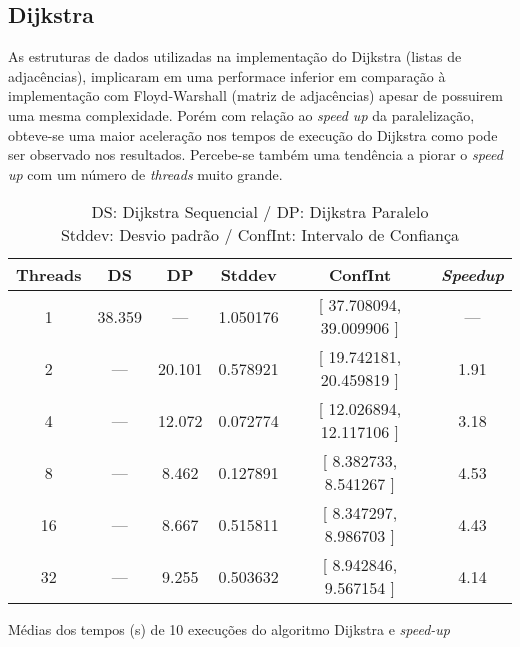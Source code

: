 \newpage
\subsection{Dijkstra}

As estruturas de dados utilizadas na implementação do Dijkstra (listas de adjacências), implicaram em uma performace inferior em comparação à implementação com Floyd-Warshall (matriz de adjacências) apesar de possuirem uma mesma complexidade. Porém com relação ao \textit{speed up} da paralelização, obteve-se uma maior aceleração nos tempos de execução do Dijkstra como pode ser observado nos resultados. Percebe-se também uma tendência a piorar o \textit{speed up} com um número de \textit{threads} muito grande.

\begin{table}[h]
\begin{center}
	\begin{tabular}{|c||c|c|c|c|c|} 
		\hline
		Threads & DS & DP & Stddev & ConfInt &\textit{Speedup} \\
		\hline

		1  & 38.359 & ---    & 1.050176 & [ 37.708094, 39.009906 ] & ---  \\
		2  & ---    & 20.101 & 0.578921 & [ 19.742181, 20.459819 ] & 1.91 \\
		4  & ---    & 12.072 & 0.072774 & [ 12.026894, 12.117106 ] & 3.18 \\
		8  & ---    &  8.462 & 0.127891 & [  8.382733,  8.541267 ] & 4.53 \\
		16 & ---    &  8.667 & 0.515811 & [  8.347297,  8.986703 ] & 4.43 \\
		32 & ---    &  9.255 & 0.503632 & [  8.942846,  9.567154 ] & 4.14 \\
		
		\hline
	\end{tabular}
	\caption{Médias dos tempos (s) de 10 execuções do algoritmo Dijkstra e \emph{speed-up}}
	\caption*{
		DS: Dijkstra Sequencial / DP: Dijkstra Paralelo\\
		Stddev: Desvio padrão / ConfInt: Intervalo de Confiança\\
	}
\end{center}
\end{table}

